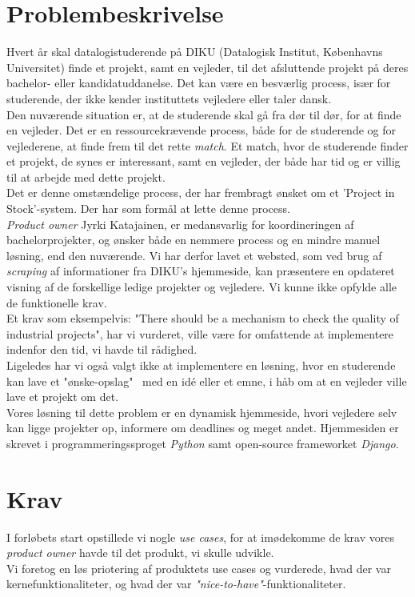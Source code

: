 \documentclass[12pt]{article}
\begin{document}
\section{Problembeskrivelse}
\label{sec:problem}
Hvert år skal datalogistuderende på DIKU (Datalogisk Institut, Københavns Universitet) finde et projekt, samt en vejleder, til det afsluttende projekt på deres bachelor- eller kandidatuddanelse. Det kan være en besværlig process, især for studerende, der ikke kender instituttets vejledere eller taler dansk.\\
Den nuværende situation er, at de studerende skal gå fra dør til dør, for at finde en vejleder. Det er en ressourcekrævende process, både for de studerende og for vejlederene, at finde frem til det rette \textit{match}. Et match, hvor de studerende finder et projekt, de synes er interessant, samt en vejleder, der både har tid og er villig til at arbejde med dette projekt. \\
Det er denne omstændelige process, der har frembragt ønsket om et 'Project in Stock'-system. Der har som formål at lette denne process. \\
\textit{Product owner} Jyrki Katajainen, er medansvarlig for koordineringen af bachelorprojekter, og ønsker både en nemmere process og en mindre manuel løsning, end den nuværende.
Vi har derfor lavet et websted, som ved brug af \textit{scraping}\cite{scraping} af informationer fra DIKU's hjemmeside, kan præsentere en opdateret visning af de forskellige ledige projekter og vejledere.
Vi kunne ikke opfylde alle de funktionelle krav. \\
Et krav som eksempelvis: "There should be a mechanism to check the quality of industrial projects", har vi vurderet, ville være for omfattende at implementere indenfor den tid, vi havde til rådighed. \\
Ligeledes har vi også valgt ikke at implementere en løsning, hvor en studerende kan lave et "ønske-opslag" \ med en idé eller et emne, i håb om at en vejleder ville lave et projekt om det. \\
Vores løsning til dette problem er en dynamisk hjemmeside, hvori vejledere selv kan ligge projekter op, informere om deadlines og meget andet. Hjemmesiden er skrevet i programmeringssproget \textit{Python} samt open-source frameworket \textit{Django}.


\section{Krav}
\label{sec:krav}
I forløbets start opstillede vi nogle \textit{use cases}, for at imødekomme de krav vores \textit{product owner} havde til det produkt, vi skulle udvikle. \\
Vi foretog en løs priotering af produktets use cases og vurderede, hvad der var kernefunktionaliteter, og hvad der var \textit{"nice-to-have"}-funktionaliteter.
\end{document}
